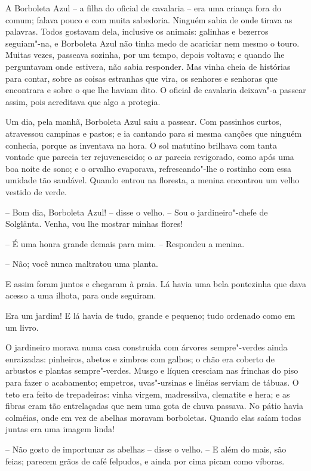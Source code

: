 A Borboleta Azul -- a filha do oficial de cavalaria -- era uma criança
fora do comum; falava pouco e com muita sabedoria. Ninguém sabia de
onde tirava as palavras. Todos gostavam dela, inclusive os animais:
galinhas e bezerros seguiam"-na, e Borboleta Azul não tinha medo de
acariciar nem mesmo o touro. Muitas vezes, passeava sozinha, por um
tempo, depois voltava; e quando lhe perguntavam onde estivera, não
sabia responder. Mas vinha cheia de histórias para contar, sobre as
coisas estranhas que vira, os senhores e senhoras que encontrara e
sobre o que lhe haviam dito. O oficial de cavalaria deixava"-a passear
assim, pois acreditava que algo a protegia.
\asterisc

Um dia, pela manhã, Borboleta Azul saiu a passear. Com passinhos curtos,
atravessou campinas e pastos; e ia cantando para si mesma canções que
ninguém conhecia, porque as inventava na hora. O sol matutino brilhava
com tanta vontade que parecia ter rejuvenescido; o ar parecia
revigorado, como após uma boa noite de sono; e o orvalho evaporava,
refrescando"-lhe o rostinho com essa umidade tão saudável. Quando
entrou na floresta, a menina encontrou um velho vestido de verde.

-- Bom dia, Borboleta Azul! -- disse o velho. -- Sou o jardineiro"-chefe
de Solglänta. Venha, vou lhe mostrar minhas flores!

-- É uma honra grande demais para mim. -- Respondeu a menina.

-- Não; você nunca maltratou uma planta.

E assim foram juntos e chegaram à praia. Lá havia uma bela pontezinha
que dava acesso a uma ilhota, para onde seguiram.

Era um jardim! E lá havia de tudo, grande e pequeno; tudo ordenado como
em um livro.

O jardineiro morava numa casa construída com árvores sempre"-verdes
ainda enraizadas: pinheiros, abetos e zimbros com galhos; o chão era
coberto de arbustos e plantas sempre"-verdes. Musgo e líquen cresciam
nas frinchas do piso para fazer o acabamento; empetros, uvas"-ursinas
e linéias serviam de tábuas. O teto era feito de trepadeiras: vinha
virgem, madressilva, clematite e hera; e as fibras eram tão
entrelaçadas que nem uma gota de chuva passava. No pátio havia
colméias, onde em vez de abelhas moravam borboletas. Quando elas saíam
todas juntas era uma imagem linda!

-- Não gosto de importunar as abelhas -- disse o velho. -- E além do mais,
são feias; parecem grãos de café felpudos, e ainda por cima picam como
víboras.

